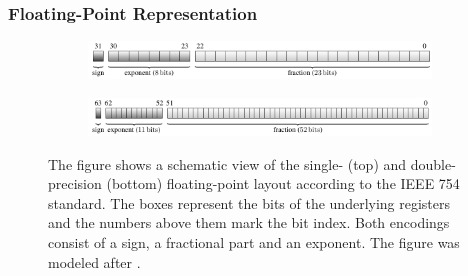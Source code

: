 \documentclass{stdlocal}
\begin{document}

  \subsubsection*{Floating-Point Representation} %
  \label{sub:floating_point_representation}
    \begin{figure}
      \center
      \begin{subfigure}[b]{\textwidth}
        \center
        \includegraphics[width=\textwidth]{figures/floating-point_encoding_single.pdf}
      \end{subfigure}

      \begin{subfigure}[b]{\textwidth}
        \center
        \includegraphics[width=\textwidth]{figures/floating-point_encoding_double.pdf}
      \end{subfigure}
      \caption[Single- and Double-Precision Floating-Point Layout]{%
        The figure shows a schematic view of the single- (top) and double-precision (bottom) floating-point layout according to the IEEE 754 standard.
        The boxes represent the bits of the underlying registers and the numbers above them mark the bit index.
        Both encodings consist of a sign, a fractional part and an exponent.
        The figure was modeled after \textcite[\ppno~197-198]{patterson2014}.
      }
      \label{fig:floating-point-encoding}
    \end{figure}
\end{document}

